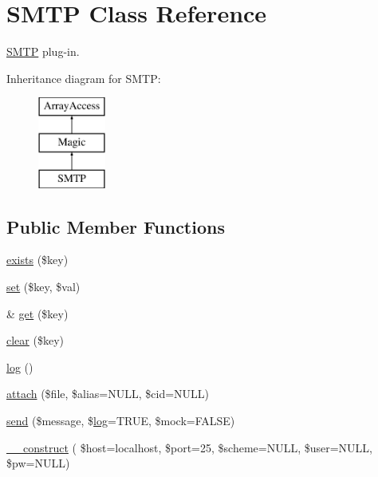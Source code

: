 \hypertarget{class_s_m_t_p}{}\section{S\+M\+TP Class Reference}
\label{class_s_m_t_p}


\hyperlink{class_s_m_t_p}{S\+M\+TP} plug-\/in.  


Inheritance diagram for S\+M\+TP\+:\begin{figure}[H]
\begin{center}
\leavevmode
\includegraphics[height=3.000000cm]{class_s_m_t_p}
\end{center}
\end{figure}
\subsection*{Public Member Functions}
\begin{DoxyCompactItemize}
\item 
\hyperlink{class_s_m_t_p_ace1ae5be37bf26c172cc7ea4e1a65e26}{exists} (\$key)
\item 
\hyperlink{class_s_m_t_p_ac8d8012023e560c81f55a629022cb65a}{set} (\$key, \$val)
\item 
\& \hyperlink{class_s_m_t_p_ac3695923790b06917410e205068b8376}{get} (\$key)
\item 
\hyperlink{class_s_m_t_p_a10a949ef75de6c82c98ac555f371ba83}{clear} (\$key)
\item 
\hyperlink{class_s_m_t_p_a5e06d9b7f0033278f40a41d081efbe71}{log} ()
\item 
\hyperlink{class_s_m_t_p_acddb7c5e0234289640206f7ee89c14e5}{attach} (\$file, \$alias=N\+U\+LL, \$cid=N\+U\+LL)
\item 
\hyperlink{class_s_m_t_p_acf11a2bd1ca8c23866ccadfbe1e0954d}{send} (\$message, \$\hyperlink{class_s_m_t_p_a5e06d9b7f0033278f40a41d081efbe71}{log}=T\+R\+UE, \$mock=F\+A\+L\+SE)
\item 
\hyperlink{class_s_m_t_p_ad7de317dd2066f6724c0a560b6791543}{\+\_\+\+\_\+construct} ( \$host=\textquotesingle{}localhost\textquotesingle{}, \$port=25, \$scheme=N\+U\+LL, \$user=N\+U\+LL, \$pw=N\+U\+LL)
\end{DoxyCompactItemize}

